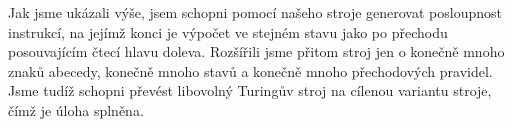 \documentclass{scrartcl}
\begin{document}
    Jak jsme ukázali výše, jsem schopni pomocí našeho stroje generovat posloupnost instrukcí, na jejímž konci je výpočet ve stejném stavu jako po přechodu posouvajícím čtecí hlavu doleva. Rozšířili jsme přitom stroj jen o konečně mnoho znaků abecedy, konečně mnoho stavů a konečně mnoho přechodových pravidel. Jsme tudíž schopni převést libovolný Turingův stroj na cílenou variantu stroje, čímž je úloha splněna.
\end{document}
